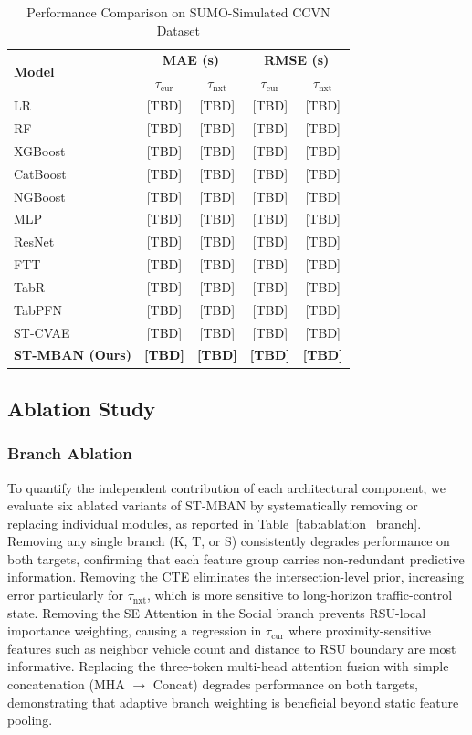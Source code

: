 \documentclass[journal]{IEEEtran}
\begin{document}
\begin{table}[!t]
\centering
\caption{Performance Comparison on SUMO-Simulated CCVN Dataset}
\label{tab:results}
\begin{tabular}{|l|cc|cc|}
\hline
\multirow{2}{*}{\textbf{Model}} & \multicolumn{2}{c|}{\textbf{MAE (s)}} & \multicolumn{2}{c|}{\textbf{RMSE (s)}} \\
 & $\tau_\text{cur}$ & $\tau_\text{nxt}$ & $\tau_\text{cur}$ & $\tau_\text{nxt}$ \\
\hline\hline
LR      & [TBD] & [TBD] & [TBD] & [TBD] \\
RF      & [TBD] & [TBD] & [TBD] & [TBD] \\
XGBoost & [TBD] & [TBD] & [TBD] & [TBD] \\
CatBoost & [TBD] & [TBD] & [TBD] & [TBD] \\
NGBoost & [TBD] & [TBD] & [TBD] & [TBD] \\
\hline
MLP    & [TBD] & [TBD] & [TBD] & [TBD] \\
ResNet & [TBD] & [TBD] & [TBD] & [TBD] \\
FTT    & [TBD] & [TBD] & [TBD] & [TBD] \\
TabR   & [TBD] & [TBD] & [TBD] & [TBD] \\
TabPFN & [TBD] & [TBD] & [TBD] & [TBD] \\
\hline
ST-CVAE \cite{STCVAE} & [TBD] & [TBD] & [TBD] & [TBD] \\
\hline
\textbf{ST-MBAN (Ours)} & \textbf{[TBD]} & \textbf{[TBD]} & \textbf{[TBD]} & \textbf{[TBD]} \\
\hline
\end{tabular}
\end{table}

\subsection{Ablation Study}

\subsubsection{Branch Ablation}
To quantify the independent contribution of each architectural component, we evaluate six ablated variants of ST-MBAN by systematically removing or replacing individual modules, as reported in Table~\ref{tab:ablation_branch}.
Removing any single branch (K, T, or S) consistently degrades performance on both targets, confirming that each feature group carries non-redundant predictive information.
Removing the CTE eliminates the intersection-level prior, increasing error particularly for $\tau_\text{nxt}$, which is more sensitive to long-horizon traffic-control state.
Removing the SE Attention in the Social branch prevents RSU-local importance weighting, causing a regression in $\tau_\text{cur}$ where proximity-sensitive features such as neighbor vehicle count and distance to RSU boundary are most informative.
Replacing the three-token multi-head attention fusion with simple concatenation (MHA $\to$ Concat) degrades performance on both targets, demonstrating that adaptive branch weighting is beneficial beyond static feature pooling.
\end{document}
